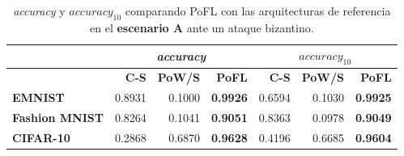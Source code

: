 \begin{table}[!ht]
\centering
\begin{tabular}{lrrrrrr}
\toprule
 & \multicolumn{3}{c}{\textit{accuracy}} & \multicolumn{3}{c}{\textit{$accuracy_{10}$}}   \\
\toprule
       & \textbf{C-S} & \textbf{PoW/S} & \textbf{PoFL} & \textbf{C-S} & \textbf{PoW/S} & \textbf{PoFL}  \\ 
\toprule
\textbf{EMNIST} & 0.8931& 0.1000& \textbf{0.9926}& 0.6594& 0.1030& \textbf{0.9925}\\  
\midrule
\textbf{Fashion MNIST}& 0.8264& 0.1041& \textbf{0.9051}& 0.8363& 0.0978& \textbf{0.9049}\\ 
\midrule
\textbf{CIFAR-10}        & 0.2868& 0.6870& \textbf{0.9628}& 0.4196& 0.6685& \textbf{0.9604}\\
\bottomrule
\end{tabular}
\caption{\textit{accuracy} y \textit{$accuracy_{10}$} comparando PoFL con las arquitecturas de referencia en el \textbf{escenario A} ante un ataque bizantino.}\label{tab:poflbyzantine_a}

\end{table}


